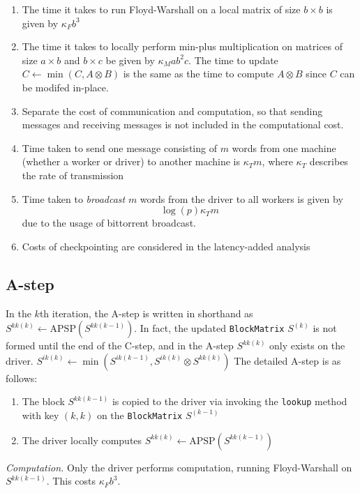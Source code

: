 \documentclass{article} %
\begin{document}
\begin{enumerate}
\item The time it takes to run Floyd-Warshall on a local matrix of size $b \times b$ is given by $\kappa_F b^3$
\item The time it takes to locally perform min-plus multiplication on
  matrices of size $a \times b$ and $b \times c$ be given by $\kappa_M
  ab^2c$. The time to update $C \leftarrow \min(C, A \otimes B)$ is the
  same as the time to compute $A \otimes B$ since $C$ can be modifed in-place.
\item Separate the cost of communication and computation, so that
  sending messages and receiving messages is not included in the
  computational cost.
\item Time taken to send one message consisting of $m$ words from one
  machine (whether a worker or driver) to another machine is $\kappa_T m$,
where $\kappa_T$ describes the rate of transmission
\item Time taken to \emph{broadcast} $m$ words from the driver to all workers is given by
\[
\log(p) \kappa_T m
\]
due to the usage of bittorrent broadcast.
\item Costs of checkpointing are considered in the latency-added analysis
\end{enumerate}


\subsection{A-step}

In the $k$th iteration, the A-step is written in shorthand as
$S^{kk(k)} \leftarrow \text{APSP}(S^{kk(k-1)})$.  In fact, the updated
{\tt BlockMatrix} $S^{(k)}$ is not formed until the end of the C-step,
and in the A-step $S^{kk(k)}$ only exists on the driver.
$S^{ik(k)} \leftarrow \min(S^{ik(k-1)}, S^{ik(k)} \otimes S^{kk(k)})$
The detailed A-step is as follows:
\begin{enumerate}
\item The block $S^{kk(k-1)}$ is copied to the driver via invoking the {\tt lookup} method with key $(k, k)$ on the {\tt  BlockMatrix} $S^{(k-1)}$
\item The driver locally computes $S^{kk(k)} \leftarrow \text{APSP}(S^{kk(k-1)})$
\end{enumerate}

\emph{Computation.} Only the driver performs computation, running
Floyd-Warshall on $S^{kk(k-1)}$.  This costs $\kappa_F b^3$.
\end{document}
